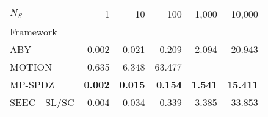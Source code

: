 \begin{tabular}{lrrrrr}
\toprule
$N_S$ & 1 & 10 & 100 & 1,000 & 10,000 \\
Framework &  &  &  &  &  \\
\midrule
ABY~\cite{DSZ15} & 0.002 & 0.021 & 0.209 & 2.094 & 20.943 \\
MOTION~\cite{BDST22} & 0.635 & 6.348 & 63.477 & -- & -- \\
MP-SPDZ~\cite{CCS:Keller20} & \bfseries 0.002 & \bfseries 0.015 & \bfseries 0.154 & \bfseries 1.541 & \bfseries 15.411 \\
SEEC - SL/SC & 0.004 & 0.034 & 0.339 & 3.385 & 33.853 \\
\bottomrule
\end{tabular}
